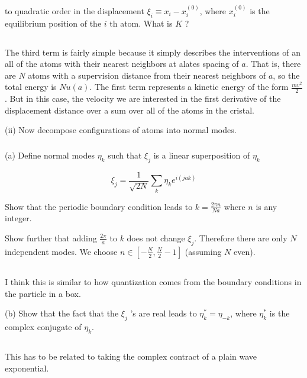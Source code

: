 \documentclass[12pt]{article}
\begin{document}
to quadratic order in the displacement $\xi_{i} \equiv x_{i}-x_{i}^{(0)}$, where $x_{i}^{(0)}$ is the equilibrium position of the $i$ th atom. What is $K$ ?
\subsection{}
\subsubsection{}
The third term is fairly simple because it simply describes the interventions of an all of the atoms with their nearest neighbors at alates spacing of $a$. That is, there are $N$ atoms with a supervision distance from their nearest neighbors of $a$, so the total energy is $N u(a)$. The first term represents a kinetic energy of the form $\frac{mv^2}{2}$. But in this case, the velocity we are interested in the first derivative of the displacement distance over a sum over all of the atoms in the cristal. 

(ii) Now decompose configurations of atoms into normal modes.
\subsubsection{}
(a) Define normal modes $\eta_{k}$ such that $\xi_{j}$ is a linear superposition of $\eta_{k}$

\begin{equation*}
\xi_{j}=\frac{1}{\sqrt{2 N}} \sum_{k} \eta_{k} e^{i(j a k)} \tag{7}
\end{equation*}


Show that the periodic boundary condition leads to $k=\frac{2 \pi n}{N a}$ where $n$ is any integer.

Show further that adding $\frac{2 \pi}{a}$ to $k$ does not change $\xi_{j}$. Therefore there are only $N$ independent modes. We choose $n \in\left[-\frac{N}{2}, \frac{N}{2}-1\right]$ (assuming $N$ even).
\subsection{}
I think this is similar to how quantization comes from the boundary conditions in the particle in a box.

(b) Show that the fact that the $\xi_{j}$ 's are real leads to $\eta_{k}^{*}=\eta_{-k}$, where $\eta_{k}^{*}$ is the complex conjugate of $\eta_{k}$.
\subsection{}
This has to be related to taking the complex contract of a plain wave exponential.
\end{document}
